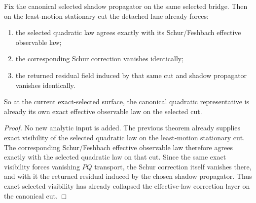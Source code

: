 \begin{theorem}
\label{thm:the-canonical-quadratic-representative-is-already-the-exact-effective-law-on-the-least-motion-cut}
Fix the canonical selected shadow propagator on the same selected bridge.
Then on the least-motion stationary cut the detached lane already forces:
\begin{enumerate}
\item the selected quadratic law agrees exactly with its Schur/Feshbach
      effective observable law;
\item the corresponding Schur correction vanishes identically;
\item the returned residual field induced by that same cut and shadow
      propagator vanishes identically.
\end{enumerate}
So at the current exact-selected surface, the canonical quadratic
representative is already its own exact effective observable law on the
selected cut.
\end{theorem}

\begin{proof}
No new analytic input is added. The previous theorem already supplies exact
visibility of the selected quadratic law on the least-motion stationary cut.
The corresponding Schur/Feshbach effective observable law therefore agrees
exactly with the selected quadratic law on that cut. Since the same exact
visibility forces vanishing \(PQ\) transport, the Schur correction itself
vanishes there, and with it the returned residual induced by the chosen shadow
propagator. Thus exact selected visibility has already collapsed the
effective-law correction layer on the canonical cut.
\end{proof}

